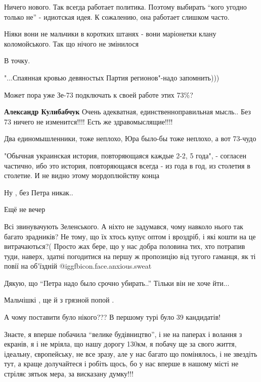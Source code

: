 \begin{itemize}

Ничего нового. Так всегда работает политика. Поэтому выбирать \enquote{кого угодно
только не} - идиотская идея. К сожалению, она работает слишком часто.

Ніяки вони не мальчики в коротких штанях - вони маріонетки клану коломойського. Так що нічого не змінилося

В точку.

"...Спаянная кровью девяностых Партия регионов"-надо запомнить)))

Может пора уже Зе-73 подключать к своей работе этих 73\%?

\begin{itemize} %
\textbf{Александр Кулибабчук}
Очень адекватная, единственноправильная мысль..
Без 73 ничего не изменится!!!!
Есть же здравомыслящие!!!!

Два единомышленники, тоже неплохо, Юра было-бы тоже неплохо, а вот 73-чудо
\end{itemize} %


"Обычная украинская история, повторяющаяся каждые 2-2, 5 года", - согласен
частично, ибо это история, повторяющаяся всегда - из года в год, из столетия в
столетие. И не видно этому мордоплюйству конца


Ну , без Петра никак..

Ещё не вечер


Всі звинувачують Зеленського. А ніхто не задумався, чому навколо нього так
багато зрадників? Не тому, що їх хтось купує оптом і вроздріб, і які кошти на
це витрачаються?( Просто жах бере, що у нас добра половина тих, хто потрапив
туди, наверх, здатні погодитися на першу ж пропозицію від тугого гаманця, як ті
повії на об'їздній @igg{fbicon.face.anxious.sweat} 


Дякую, що \enquote{Петра надо было срочно убирать..} Тільки він не хоче йти...

Мальчішкі , ще й з грязной попой .

А чому поставити було нікого??? В першому турі було 39 кандидатів!


Знаєте, я вперше побачила \enquote{велике будівництво}, і не на паперах і волання з
екранів, я і не мріяла, що нашу дорогу 130км, я побачу ще за свого
життя, ідеальну, європейську, не все зразу, але у нас багато що помінялось, і не
звездіть тут, а краще долучайтеся і робіть щось, бо у нас вперше в нашому місті
не стріляє зятьок мера, за висказану думку!!!


\end{itemize}
